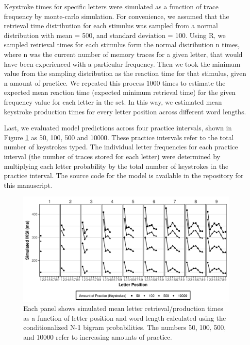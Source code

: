 \documentclass[,man,floatsintext]{apa6}
\begin{document}
Keystroke times for specific letters were simulated as a function of trace frequency by monte-carlo simulation. For convenience, we assumed that the retrieval time distribution for each stimulus was sampled from a normal distribution with mean = 500, and standard deviation = 100. Using R, we sampled retrieval times for each stimulus form the normal distribution n times, where n was the current number of memory traces for a given letter, that would have been experienced with a particular frequency. Then we took the minimum value from the sampling distribution as the reaction time for that stimulus, given n amount of practice. We repeated this process 1000 times to estimate the expected mean reaction time (expected minimum retrieval time) for the given frequency value for each letter in the set. In this way, we estimated mean keystroke production times for every letter position across different word lengths.

Last, we evaluated model predictions across four practice intervals, shown in Figure \ref{fig:figure5} as 50, 100, 500 and 10000. These practice intervals refer to the total number of keystrokes typed. The individual letter frequencies for each practice interval (the number of traces stored for each letter) were determined by multiplying each letter probability by the total number of keystrokes in the practice interval. The source code for the model is available in the repository for this manuscript.



\begin{figure}
\centering
\includegraphics{v2-manuscript_files/figure-latex/figure5-1.pdf}
\caption{\label{fig:figure5}Each panel shows simulated mean letter retrieval/production times as a function of letter position and word length calculated using the conditionalized N-1 bigram probabilities. The numbers 50, 100, 500, and 10000 refer to increasing amounts of practice.}
\end{figure}
\end{document}

